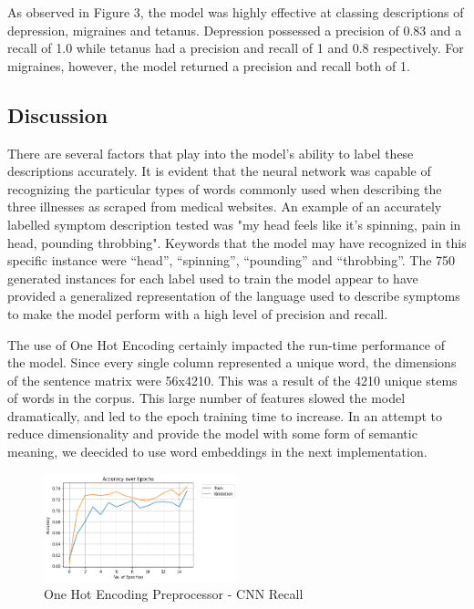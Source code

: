 \documentclass[12pt]{report}
\begin{document}
As observed in Figure 3, the model was highly effective at classing descriptions of
depression, migraines and tetanus. Depression possessed a precision of 0.83 and a
recall of 1.0 while tetanus had a precision and recall of 1 and 0.8 respectively.
For migraines, however, the model returned a precision and recall both of 1.

\subsection{Discussion}
There are several factors that play into the model's ability to label these descriptions
accurately. It is evident that the neural network was capable of recognizing the particular
types of words commonly used when describing the three illnesses as scraped from medical
websites. An example of an accurately labelled symptom description tested was "my head
feels like it's spinning, pain in head, pounding throbbing". Keywords that the model
may have recognized in this specific instance were “head”, “spinning”, “pounding” and
“throbbing”. The 750 generated instances for each label used to train the model appear to
have provided a generalized representation of the language used to describe symptoms to make
the model perform with a high level of precision and recall.

The use of One Hot Encoding certainly impacted the run-time performance of the model.
Since every single column represented a unique word, the dimensions of the sentence matrix
were 56x4210. This was a result of the 4210 unique stems of words in the corpus. This large
number of features slowed the model dramatically, and led to the epoch training time to increase.
In an attempt to reduce dimensionality and provide the model with some form of semantic
meaning, we deecided to use word embeddings in the next implementation.


\begin{figure}[h!]
	\centering
	\includegraphics[width=0.5\textwidth]{accuracy-1.png}
	\caption{One Hot Encoding Preprocessor - CNN Recall}
	\label{fig:ohep-acc}
\end{figure}
\end{document}
